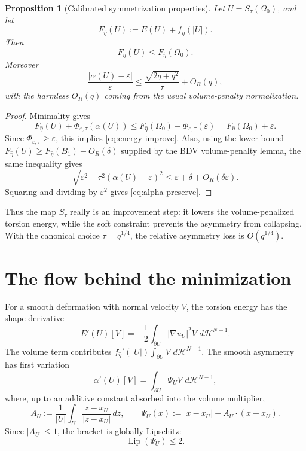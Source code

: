 \documentclass[11pt]{article}
\newtheorem{proposition}[theorem]{Proposition}
\newcommand{\abs}[1]{\left|#1\right|}
\newcommand{\dH}{\,d\mathcal H^{N-1}}
\begin{document}
\begin{proposition}[Calibrated symmetrization properties]\label{prop:cal}
Let \(U=S_\tau(\Omega_0)\), and let
\[
   F_{\hat\eta}(U):=E(U)+f_{\hat\eta}(\abs U).
\]
Then
\[
   F_{\hat\eta}(U)\le F_{\hat\eta}(\Omega_0).
   \tag{2.4}\label{eq:energy-improve}
\]
Moreover
\[
   \frac{\abs{\alpha(U)-\varepsilon}}{\varepsilon}
      \le
      \frac{\sqrt{2q+q^2}}{\tau}
      +O_R(q),
   \tag{2.5}\label{eq:alpha-preserve}
\]
with the harmless \(O_R(q)\) coming from the usual volume-penalty
normalization.
\end{proposition}

\begin{proof}
Minimality gives
\[
   F_{\hat\eta}(U)+\Phi_{\varepsilon,\tau}(\alpha(U))
      \le
   F_{\hat\eta}(\Omega_0)+\Phi_{\varepsilon,\tau}(\varepsilon)
      =
   F_{\hat\eta}(\Omega_0)+\varepsilon.
\]
Since \(\Phi_{\varepsilon,\tau}\ge\varepsilon\), this implies
\eqref{eq:energy-improve}.  Also, using the lower bound
\(F_{\hat\eta}(U)\ge F_{\hat\eta}(B_1)-O_R(\delta)\) supplied by the BDV
volume-penalty lemma, the same inequality gives
\[
   \sqrt{\varepsilon^2+\tau^2(\alpha(U)-\varepsilon)^2}
      \le
   \varepsilon+\delta+O_R(\delta\varepsilon).
\]
Squaring and dividing by \(\varepsilon^2\) gives
\eqref{eq:alpha-preserve}.
\end{proof}

Thus the map \(S_\tau\) really is an improvement step: it lowers the
volume-penalized torsion energy, while the soft constraint prevents the
asymmetry from collapsing.  With the canonical choice \(\tau=q^{1/4}\), the
relative asymmetry loss is \(O(q^{1/4})\).

\section{The flow behind the minimization}

For a smooth deformation with normal velocity \(V\), the torsion energy has
the shape derivative
\[
   E'(U)[V]
      =
      -\frac12\int_{\partial U}\abs{\nabla u_U}^2 V\,\dH.
   \tag{3.1}
\]
The volume term contributes \(f_{\hat\eta}'(\abs U)\int_{\partial U}V\,\dH\).
The smooth asymmetry has first variation
\[
   \alpha'(U)[V]
      =
      \int_{\partial U}\Psi_U V\,\dH,
   \tag{3.2}
\]
where, up to an additive constant absorbed into the volume multiplier,
\[
   A_U:=\frac1{\abs U}
      \int_U\frac{z-x_U}{\abs{z-x_U}}\,dz,
   \qquad
   \Psi_U(x):=\abs{x-x_U}-A_U\cdot(x-x_U).
   \tag{3.3}
\]
Since \(\abs{A_U}\le1\), the bracket is globally Lipschitz:
\[
   \operatorname{Lip}(\Psi_U)\le 2.
   \tag{3.4}
\]
\end{document}
